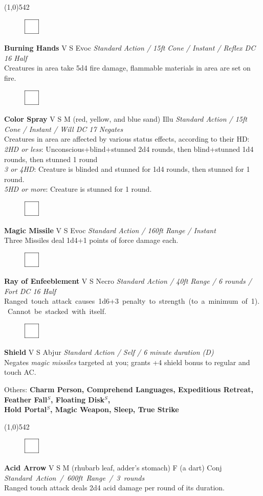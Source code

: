 \documentclass[letterpaper]{article}
\newcommand{\fullline}{\noindent\line(1,0){542} \\}
\newcommand{\spell}[7]{
\begin{figure}
\vspace{-13pt}
\ifstrequal{#2}{Full}{  \includegraphics[width=2em]{Checkbox-Full}}{
\ifstrequal{#2}{Scroll}{\includegraphics[width=2em]{Checkbox-S}}{
                        \includegraphics[width=2em]{Checkbox}}}
\ifstrequal{#7}{}{\vspace{-1em}}{\vspace{#7}}
\end{figure}
\noindent \textbf{#1} #3 {
    \ifstrequal{#4}{Conj}{\color{Plum}Conj}{%
    \ifstrequal{#4}{Divin}{\color{YellowOrange}Divin}{%
    \ifstrequal{#4}{Ench}{\color{VioletRed}Ench}{%
    \ifstrequal{#4}{Trans}{\color{LimeGreen}Trans}{%
    \ifstrequal{#4}{Evoc}{\color{RedOrange}Evoc}{%
    \ifstrequal{#4}{Illu}{\color{ProcessBlue}Illu}{%
    \ifstrequal{#4}{Abjur}{\color{CadetBlue}Abjur}{%
    \ifstrequal{#4}{Necro}{\color{Red}Necro}{%
}}}}}}}}}
{\footnotesize \emph{#5}} \\
#6
}
\newcommand{\s}[0]{$^S$}
\begin{document}
\fullline
\vspace{-1.25em}

\spell{Burning Hands}{}{V S}{Evoc}{Standard Action / 15ft Cone / Instant / Reflex DC 16 Half}{%
Creatures in area take 5d4 fire damage, flammable materials in area are set on fire.}{}\\[-1em] %

\spell{Color Spray}{}{V S M (red, yellow, and blue sand)}{Illu}{Standard Action / 15ft Cone / Instant / Will DC 17 Negates}{%
Creatures in area are affected by various status effects, according to their HD:\\
\emph{2HD or less}: Unconscious+blind+stunned 2d4 rounds, then blind+stunned 1d4 rounds, then stunned 1 round \\
\emph{3 or 4HD}: Creature is blinded and stunned for 1d4 rounds, then stunned for 1 round.\\
\emph{5HD or more}: Creature is stunned for 1 round.}{1em}

\spell{Magic Missile}{}{V S}{Evoc}{Standard Action / 160ft Range / Instant}{%
Three Missiles deal 1d4+1 points of force damage each.}{} \\[-1em] %

\spell{Ray of Enfeeblement}{}{V S}{Necro}{Standard Action / 40ft Range / 6 rounds / Fort DC 16 Half}{%
\mbox{Ranged touch attack causes 1d6+3 penalty to strength (to a minimum of 1).  Cannot be stacked with itself.}}{} \\[-1em] %

\spell{Shield}{}{V S}{Abjur}{Standard Action / Self / 6 minute duration (D)}{%
Negates \emph{magic missiles} targeted at you; grants +4 shield bonus to regular and touch AC.}{}\\[-1em] %

\begin{adjustwidth}{3em}{0em}
Others: \textbf{Charm Person, Comprehend Languages, Expeditious Retreat, Feather Fall\s , Floating Disk\s ,\\ Hold Portal\s , Magic Weapon, Sleep, True Strike} \\[-2em]
\end{adjustwidth}

\fullline
\vspace{-1.25em}

\spell{Acid Arrow}{}{V S M (rhubarb leaf, adder's stomach) F (a dart)}{Conj}{\mbox{Standard Action / 600ft Range / 3 rounds}}{%
Ranged touch attack deals 2d4 acid damage per round of its duration.}{}\\[-1em] %
\end{document}
